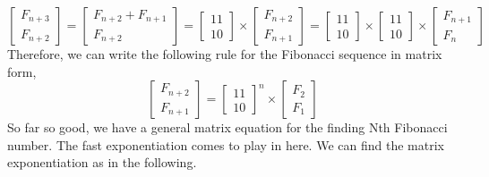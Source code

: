 \documentclass[12pt]{article}
\begin{document}
\[
\begin{bmatrix}
    F_{n+3}\\
    F_{n+2}
\end{bmatrix}
= 
\begin{bmatrix}
    F_{n+2} + F_{n+1}\\
    F_{n+2}
\end{bmatrix}
=
\begin{bmatrix} 
    1 1  \\
    1 0
\end{bmatrix}
\times
\begin{bmatrix}
    F_{n+2} \\
    F_{n+1}
\end{bmatrix}
=
\begin{bmatrix} 
    1 1  \\
    1 0
\end{bmatrix}
\times
\begin{bmatrix} 
    1 1  \\
    1 0
\end{bmatrix}
\times
\begin{bmatrix}
    F_{n+1} \\
    F_{n}
\end{bmatrix}
\]
Therefore, we can write the following rule for the Fibonacci sequence in matrix form,
\[ \begin{bmatrix}
    F_{n+2}\\
    F_{n+1}
\end{bmatrix}
=
\begin{bmatrix}
    1 1  \\
    1 0
\end{bmatrix}^{n}
\times
\begin{bmatrix}
    F_2 \\
    F_1
\end{bmatrix} \]
So far so good, we have a general matrix equation for the finding Nth Fibonacci number. The fast exponentiation comes to play in here. We can find the matrix exponentiation as in the following.
\end{document}
